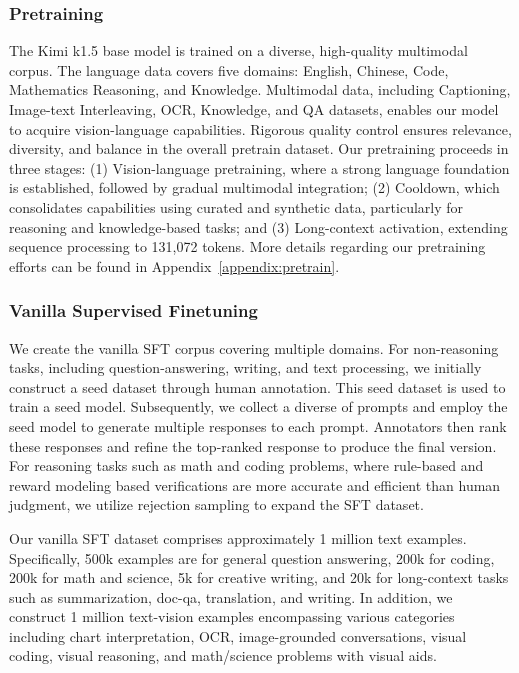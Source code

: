 \documentclass{article}
\begin{document}
\subsubsection{Pretraining}

The Kimi k1.5 base model is trained on a diverse, high-quality multimodal corpus. The language data covers five domains: English, Chinese, Code, Mathematics  Reasoning, and Knowledge. Multimodal data, including Captioning, Image-text Interleaving, OCR, Knowledge, and QA datasets, enables our model to acquire vision-language capabilities. Rigorous quality control ensures relevance, diversity, and balance in the overall pretrain dataset. Our pretraining proceeds in three stages: (1) Vision-language pretraining, where a strong language foundation is established, followed by gradual multimodal integration; (2) Cooldown, which consolidates capabilities using curated and synthetic data, particularly for reasoning and knowledge-based tasks; and (3) Long-context activation, extending sequence processing to 131,072 tokens. More details regarding our pretraining efforts can be found in Appendix~\ref{appendix:pretrain}. 

\subsubsection{Vanilla Supervised Finetuning}
\label{sec:vanilla_supervised_finetuning}
We create the vanilla SFT corpus covering multiple domains. For non-reasoning tasks, including question-answering, writing, and text processing, we initially construct a seed dataset through human annotation. This seed dataset is used to train a seed model. Subsequently, we collect a diverse of prompts and employ the seed model to generate multiple responses to each prompt. Annotators then rank these responses and refine the top-ranked response to produce the final version. For reasoning tasks such as math and coding problems, where rule-based and reward modeling based verifications are more accurate and efficient than human judgment, we utilize rejection sampling to expand the SFT dataset.

Our vanilla SFT dataset comprises approximately 1 million text examples. Specifically, 500k examples are for general question answering, 200k for coding, 200k for math and science, 5k for creative writing, and 20k for long-context tasks such as summarization, doc-qa, translation, and writing. In addition, we construct 1 million text-vision examples encompassing various categories including chart interpretation, OCR, image-grounded conversations, visual coding, visual reasoning, and math/science problems with visual aids. 
\end{document}
